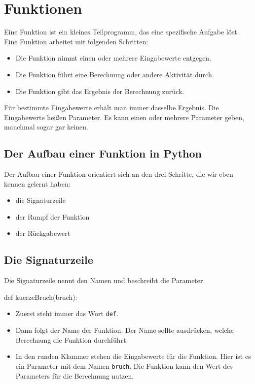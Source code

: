 \section{Funktionen}

Eine Funktion ist ein kleines Teilprogramm, das eine spezifische Aufgabe löst. Eine Funktion arbeitet mit folgenden Schritten:
\begin{itemize}
	\item Die Funktion nimmt einen oder mehrere Eingabewerte entgegen.
	\item Die Funktion führt eine Berechnung oder andere Aktivität durch.
	\item Die Funktion gibt das Ergebnis der Berechnung zurück.
\end{itemize}

Für bestimmte Eingabewerte erhält man immer dasselbe Ergebnis. Die Eingabewerte heißen Parameter. Es kann einen oder mehrere Parameter geben, manchmal sogar gar keinen.

\subsection*{Der Aufbau einer Funktion in Python}

Der Aufbau einer Funktion orientiert sich an den drei Schritte, die wir eben kennen gelernt haben:
\begin{itemize}
	\item die Signaturzeile
	\item der Rumpf der Funktion 
	\item der Rückgabewert
\end{itemize}

\subsection*{Die Signaturzeile}

Die Signaturzeile nennt den Namen und beschreibt die Parameter.
\begin{codePython}
def kuerzeBruch(bruch):
\end{codePython}

\begin{itemize}
	\item Zuerst steht immer das Wort \texttt{def}.
	\item Dann folgt der Name der Funktion. Der Name sollte ausdrücken, welche Berechnung die Funktion durchführt.
	\item In den runden Klammer stehen die Eingabewerte für die Funktion. Hier ist es ein Parameter mit dem Namen \texttt{bruch}. Die Funktion kann den Wert des Parameters für die Berechnung nutzen.
\end{itemize}

